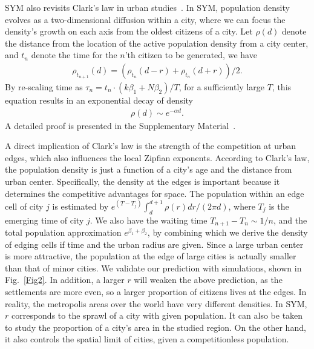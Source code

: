 \documentclass[reprint,unsortedaddress,amsmath,amssymb,aps,prl,showkeys]{revtex4-2}
\begin{document}
SYM also revisits Clark's law in urban studies~\cite{clark1951urban}. In SYM, population density evolves as a two-dimensional diffusion within a city\cite{doi:10.1137/0150099}, where we can focus the density's growth on each axis from the oldest citizens of a city. Let $\rho(d)$ denote the distance from the location of the active population density from a city center, and $t_n$ denote the time for the $n$'th citizen to be generated, we have 
\begin{align}
	\rho_{t_{n+1}}(d) = (\rho_{t_{n}}(d-r) + \rho_{t_{n}}(d+r) )/2.\label{loc_den}  
\end{align} By re-scaling time as $\tau_n = t_n\cdot (k\beta_1+N\beta_2)/T$, for a sufficiently large $T$, this equation results in an exponential decay of density
\begin{align}
	\rho(d)\sim e^{-\alpha d}\label{clark_eq}.
\end{align} A detailed proof is presented in the Supplementary Material~\cite{SuppInfo}. 

A direct implication of Clark's law is the strength of the competition at urban edges, which also influences the local Zipfian exponents. According to Clark's law, the population density is just a function of a city's age and the distance from urban center. Specifically, the density at the edges is important because it determines the competitive advantages for space. The population within an edge cell of city $j$ is estimated by $e^{(T-T_j)}\int_{d}^{d+1}\rho(r) dr/(2\pi d)$, where $T_j$ is the emerging time of city $j$. We also have the waiting time $T_{n+1}-T_{n}\sim 1/n$, and the total population approximation $e^{\beta_1+\beta_2}$, by combining which we derive the density of edging cells if time and the urban radius are given. Since a large urban center is more attractive, the population at the edge of large cities is actually smaller than that of minor cities. We validate our prediction with simulations, shown in Fig.~\ref{Fig2}. %
In addition, a larger $r$ will weaken the above prediction, as the settlements are more even, so a larger proportion of citizens lives at the edges. In reality, the metropolis areas over the world have very different densities. In SYM, $r$ corresponds to the sprawl of a city with given population. It can also be taken to study the proportion of a city's area in the studied region. On the other hand, it also controls the spatial limit of cities, given a competitionless population.
\end{document}
